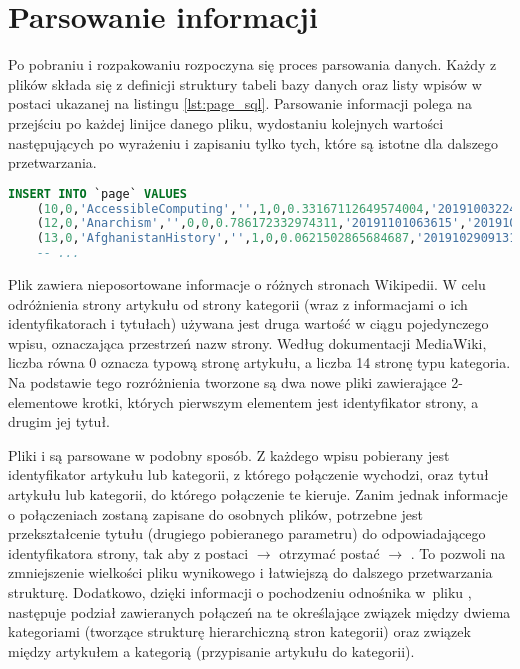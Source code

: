 \section{Parsowanie informacji}
\label{sec:data-parsing}
Po pobraniu i rozpakowaniu rozpoczyna się proces parsowania danych. Każdy z plików  składa się z definicji struktury tabeli bazy danych oraz listy wpisów w postaci ukazanej na listingu \ref{lst:page_sql}. Parsowanie informacji polega na przejściu po każdej linijce danego pliku, wydostaniu kolejnych wartości następujących po wyrażeniu  i zapisaniu tylko tych, które są istotne dla dalszego przetwarzania.

\begin{lstlisting}[language=SQL,frame=single,caption={Fragment pliku \lstinline{enwiki-20191101-page.sql} zawierający dane o stronach},label=lst:page_sql]
INSERT INTO `page` VALUES
    (10,0,'AccessibleComputing','',1,0,0.33167112649574004,'20191003224230','20190105021557',854851586,94,'wikitext',NULL),
    (12,0,'Anarchism','',0,0,0.786172332974311,'20191101063615','20191031183024',923631615,104479,'wikitext',NULL),
    (13,0,'AfghanistanHistory','',1,0,0.0621502865684687,'20191029091312','20190618192734',783865149,90,'wikitext',NULL),
    -- ...
\end{lstlisting}

Plik  zawiera nieposortowane informacje o różnych stronach Wikipedii. W celu odróżnienia strony artykułu od strony kategorii (wraz z informacjami o ich identyfikatorach i tytułach) używana jest druga wartość w ciągu pojedynczego wpisu, oznaczająca przestrzeń nazw strony. Według dokumentacji MediaWiki, liczba równa 0 oznacza typową stronę artykułu, a liczba 14 stronę typu kategoria. Na podstawie tego rozróżnienia tworzone są dwa nowe pliki zawierające 2-elementowe krotki, których pierwszym elementem jest identyfikator strony, a drugim jej tytuł.

Pliki  i  są parsowane w podobny sposób. Z każdego wpisu pobierany jest identyfikator artykułu lub kategorii, z którego połączenie wychodzi, oraz tytuł artykułu lub kategorii, do którego połączenie te kieruje. Zanim jednak informacje o połączeniach zostaną zapisane do osobnych plików, potrzebne jest przekształcenie tytułu (drugiego pobieranego parametru) do odpowiadającego identyfikatora strony, tak aby z postaci  \(\rightarrow\)  otrzymać postać  \(\rightarrow\) . To pozwoli na zmniejszenie wielkości pliku wynikowego i łatwiejszą do dalszego przetwarzania strukturę. Dodatkowo, dzięki informacji o pochodzeniu odnośnika w~pliku , następuje podział zawieranych połączeń na te określające związek między dwiema kategoriami (tworzące strukturę hierarchiczną stron kategorii) oraz związek między artykułem a kategorią (przypisanie artykułu do kategorii).

